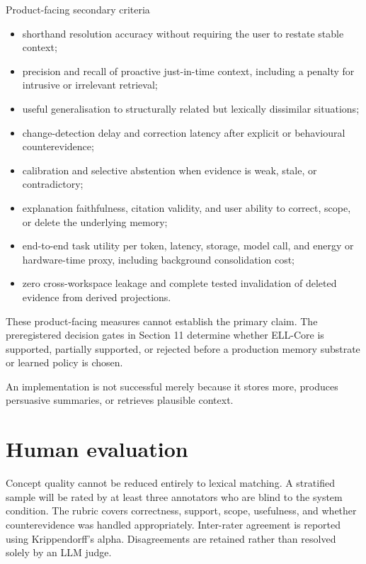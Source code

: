 \documentclass[
  english,
  a4paper,
  DIV=11,
  numbers=noendperiod]{scrreprt}
\providecommand{\tightlist}{%
  \setlength{\itemsep}{0pt}\setlength{\parskip}{0pt}}
\begin{document}
Product-facing secondary criteria

\begin{itemize}
\tightlist
\item
  shorthand resolution accuracy without requiring the user to restate
  stable context;
\item
  precision and recall of proactive just-in-time context, including a
  penalty for intrusive or irrelevant retrieval;
\item
  useful generalisation to structurally related but lexically dissimilar
  situations;
\item
  change-detection delay and correction latency after explicit or
  behavioural counterevidence;
\item
  calibration and selective abstention when evidence is weak, stale, or
  contradictory;
\item
  explanation faithfulness, citation validity, and user ability to
  correct, scope, or delete the underlying memory;
\item
  end-to-end task utility per token, latency, storage, model call, and
  energy or hardware-time proxy, including background consolidation
  cost;
\item
  zero cross-workspace leakage and complete tested invalidation of
  deleted evidence from derived projections.
\end{itemize}

These product-facing measures cannot establish the primary claim. The
preregistered decision gates in Section 11 determine whether ELL-Core is
supported, partially supported, or rejected before a production memory
substrate or learned policy is chosen.

An implementation is not successful merely because it stores more,
produces persuasive summaries, or retrieves plausible context.

\section{Human evaluation}\label{human-evaluation}

Concept quality cannot be reduced entirely to lexical matching. A
stratified sample will be rated by at least three annotators who are
blind to the system condition. The rubric covers correctness, support,
scope, usefulness, and whether counterevidence was handled
appropriately. Inter-rater agreement is reported using Krippendorff's
alpha. Disagreements are retained rather than resolved solely by an LLM
judge.
\end{document}
